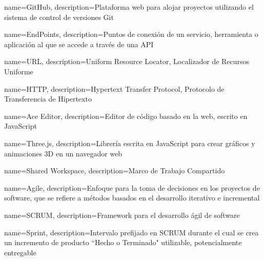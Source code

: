 {
    name=GitHub,
    description={Plataforma web para alojar proyectos utilizando el sistema de control de versiones Git}
}


{
    name=EndPoints,
    description={Puntos de conexión de un servicio, herramienta o aplicación al que se accede a través de una API}
}

{
    name=URL,
    description={Uniform Resource Locator, Localizador de Recursos Uniforme}
}




{
    name=HTTP,
    description={Hypertext Transfer Protocol, Protocolo de Transferencia de Hipertexto}
}

{
    name=Ace Editor,
    description={Editor de código basado en la web, escrito en JavaScript}
}

{
    name=Three.js,
    description={Librería escrita en JavaScript para crear gráficos y animaciones 3D en un navegador web}
}

{
    name=Shared Workspace,
    description={Marco de Trabajo Compartido}
}


{
    name=Agile,
    description={Enfoque para la toma de decisiones en los proyectos de software, que se refiere a métodos basados en el desarrollo iterativo e incremental}
}

{
    name=SCRUM,
    description={Framework para el desarrollo ágil de software}
}

{
    name=Sprint,
    description={Intervalo prefijado en SCRUM durante el cual se crea un incremento de producto ``Hecho o Terminado" utilizable, potencialmente entregable}
}




